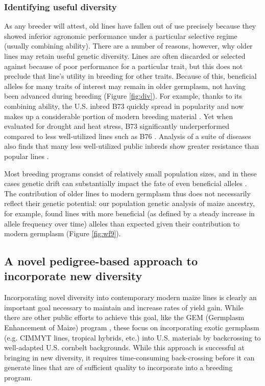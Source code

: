 \documentclass[12pt]{article}
\begin{document}
\subsubsection*{Identifying useful diversity}
As any breeder will attest, old lines have fallen out of use precisely because they showed inferior agronomic performance under a particular selective regime (usually combining ability).
There are a number of reasons, however, why older lines may retain useful genetic diversity.
Lines are often discarded or selected against because of poor performance for a particular trait, but this does not preclude that line's utility in breeding for other traits.
Because of this, beneficial alleles for many traits of interest may remain in older germplasm, not having been advanced during breeding (Figure \ref{fig:div}).
For example, thanks to its combining ability, the U.S. inbred B73 quickly spread in popularity and now makes up a considerable portion of modern breeding material \citep{van2012historical}. 
Yet when evaluated for drought and heat stress, B73 significantly underperformed compared to less well-utilized lines such as B76 \citep{chen2012characterization}.
Analysis of a suite of diseases also finds that many less well-utilized public inbreds show greater resistance than popular lines \citep{wisser2011multivariate}. 

Most breeding programs consist of relatively small population sizes, and in these cases genetic drift can substantially impact the fate of even beneficial alleles \citep[e.g.][]{Gerke:2013tw}.
The contribution of older lines to modern germplasm thus does not necessarily reflect their genetic potential: our population genetic analysis of maize ancestry, for example, found lines with more beneficial (as defined by a steady increase in allele frequency over time) alleles than expected given their contribution to modern germplasm (Figure \ref{fig:wf9}).

\subsection*{A novel pedigree-based approach to incorporate new diversity}

Incorporating novel diversity into contemporary modern maize lines is clearly an important goal necessary to maintain and increase rates of yield gain.
While there are other public efforts to achieve this goal, like the GEM  (Germplasm Enhancement of Maize) program \citep{pollak2003history}, these  focus on incorporating exotic germplasm (e.g. CIMMYT lines, tropical hybrids, etc.) into U.S. materials by backcrossing to well-adapted U.S. cornbelt backgrounds.
While this approach is successful at bringing in new diversity, it requires time-consuming back-crossing before it can generate lines that are of sufficient quality to incorporate into a breeding program.
\end{document}
